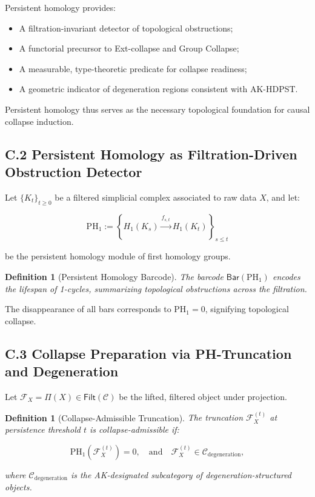 \documentclass[11pt]{article}
\newtheorem{definition}[theorem]{Definition}
\begin{document}
Persistent homology provides:

\begin{itemize}
    \item A filtration-invariant detector of topological obstructions;
    \item A functorial precursor to Ext-collapse and Group Collapse;
    \item A measurable, type-theoretic predicate for collapse readiness;
    \item A geometric indicator of degeneration regions consistent with AK-HDPST.
\end{itemize}

Persistent homology thus serves as the necessary topological foundation for causal collapse induction.

\subsection*{C.2 Persistent Homology as Filtration-Driven Obstruction Detector}

Let \( \{ K_t \}_{t \geq 0} \) be a filtered simplicial complex associated to raw data \( X \), and let:

\[
\mathrm{PH}_1 := \left\{ H_1(K_s) \xrightarrow{f_{s,t}} H_1(K_t) \right\}_{s \leq t}
\]

be the persistent homology module of first homology groups.

\begin{definition}[Persistent Homology Barcode]
The barcode \( \mathsf{Bar}(\mathrm{PH}_1) \) encodes the lifespan of 1-cycles, summarizing topological obstructions across the filtration.
\end{definition}

The disappearance of all bars corresponds to \( \mathrm{PH}_1 = 0 \), signifying topological collapse.

\subsection*{C.3 Collapse Preparation via PH-Truncation and Degeneration}

Let \( \mathcal{F}_X = \Pi(X) \in \mathsf{Filt}(\mathcal{C}) \) be the lifted, filtered object under projection.

\begin{definition}[Collapse-Admissible Truncation]
The truncation \( \mathcal{F}_X^{(t)} \) at persistence threshold \( t \) is \emph{collapse-admissible} if:

\[
\mathrm{PH}_1(\mathcal{F}_X^{(t)}) = 0, \quad \text{and} \quad \mathcal{F}_X^{(t)} \in \mathcal{C}_{\mathrm{degeneration}},
\]

where \( \mathcal{C}_{\mathrm{degeneration}} \) is the AK-designated subcategory of degeneration-structured objects.
\end{definition}
\end{document}
